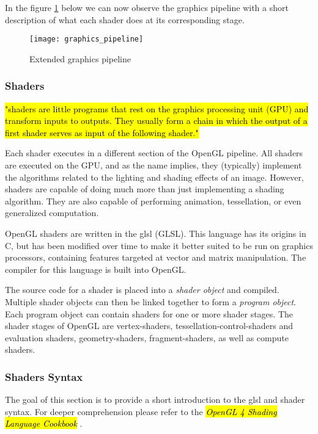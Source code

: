 In the figure \ref{fig:graphics_pipeline} below we can now observe the graphics pipeline with a short description of what each \gls{shader} does at its corresponding stage.

\begin{figure}[h!]
	\centering
	\caption{Extended graphics pipeline \cite{learnopengl}}
	\texttt{[image: graphics\_pipeline]}	
	\label{fig:graphics_pipeline}
\end{figure}

\newpage
\subsubsection{Shaders}

\hl{"\glspl{shader} are little programs that rest on the graphics processing unit (GPU) and transform inputs to outputs. They usually form a chain in which the output of a first shader serves as input of the following shader."} \cite{shading}

Each \gls{shader} executes in a different section of the OpenGL pipeline. All \glspl{shader} are executed on the GPU, and as the name implies, they (typically) implement the algorithms related to the lighting and shading effects of an image. However, \glspl{shader} are capable of doing much more than just implementing a shading algorithm. They are also capable of performing animation, tessellation, or even generalized computation.

OpenGL \glspl{shader} are written in the \gls{glsl} (GLSL). This language has its origins in C, but has been modified over time to make it better suited to be run on graphics processors, containing features targeted at vector and matrix manipulation. The compiler for this language is built into OpenGL. 

The source code for a \gls{shader} is placed into a \emph{shader object} and compiled. Multiple shader objects can then be linked together to form a \emph{program object}. Each program object can contain \glspl{shader} for one or more shader stages. The shader stages of OpenGL are \glspl{vertex-shader}, \glspl{tessellation-control-shader} and evaluation shaders, \glspl{geometry-shader}, \glspl{fragment-shader}, as well as compute shaders. 


\subsubsection{Shaders Syntax}

The goal of this section is to provide a short introduction to the \gls{glsl} and \gls{shader} syntax. For deeper comprehension please refer to the \hl{\emph{OpenGL 4 Shading Language Cookbook}} \cite{shading}.

